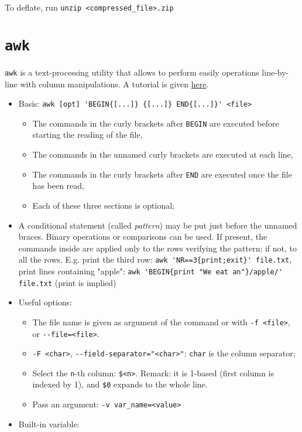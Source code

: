 \documentclass[a4paper,12pt,%
              final%
              ]{article}
\begin{document}
To deflate, run \verb|unzip <compressed_file>.zip|

\section{\texttt{awk}}
\texttt{awk} is a text-processing utility that allows to perform easily operations line-by-line with column manipulations. A tutorial is given \href{https://www.tutorialspoint.com/awk/index.htm}{here}.
\begin{itemize}
  \item Basis: \verb|awk [opt] 'BEGIN{[...]} {[...]} END{[...]}' <file>|
    \begin{itemize}
      \item The commands in the curly brackets after \texttt{BEGIN} are executed before starting the reading of the file,
      \item The commands in the unnamed curly brackets are executed at each line,
      \item The commands in the curly brackets after \texttt{END} are executed once the file has been read,
      \item Each of these three sections is optional;
    \end{itemize}
  \item A conditional statement (called \emph{pattern}) may be put just before the unnamed braces. Binary operations or comparisons can be used. If present, the commands inside are applied only to the rows verifying the pattern; if not, to all the rows. E.g. print the third row: \verb|awk 'NR==3{print;exit}' file.txt|, print lines containing "apple": \verb|awk 'BEGIN{print "We eat an"}/apple/' file.txt| (print is implied)
  \item Useful options:
    \begin{itemize}
      \item The file name is given as argument of the command or with \verb|-f <file>|, or \verb|--file=<file>|.
      \item \verb|-F <char>|, \verb|--field-separator="<char>"|: \verb|char| is the column separator;
      \item Select the \texttt{n}-th column: \verb|$<n>|. Remark: it is 1-based (first column is indexed by 1), and \verb|$0| expands to the whole line.
      \item Pass an argument: \verb|-v var_name=<value>|
    \end{itemize}
  \item Built-in variable:
    \begin{itemize}

\end{itemize}
\end{itemize}
\end{document}
